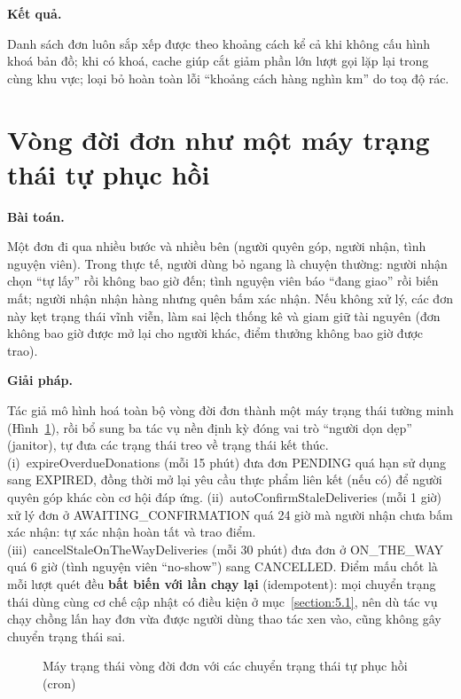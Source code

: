 \documentclass[../main.tex]{subfiles}%
\begin{document}
\textbf{Kết quả.} 

Danh sách đơn luôn sắp xếp được theo khoảng cách kể cả khi không cấu hình khoá bản đồ; khi có khoá, cache giúp cắt giảm phần lớn lượt gọi lặp lại trong cùng khu vực; loại bỏ hoàn toàn lỗi ``khoảng cách hàng nghìn km'' do toạ độ rác.

\section{Vòng đời đơn như một máy trạng thái tự phục hồi}
\label{section:5.3}

\textbf{Bài toán.} 

Một đơn đi qua nhiều bước và nhiều bên (người quyên góp, người nhận, tình nguyện viên). Trong thực tế, người dùng bỏ ngang là chuyện thường: người nhận chọn ``tự lấy'' rồi không bao giờ đến; tình nguyện viên báo ``đang giao'' rồi biến mất; người nhận nhận hàng nhưng quên bấm xác nhận. Nếu không xử lý, các đơn này kẹt trạng thái vĩnh viễn, làm sai lệch thống kê và giam giữ tài nguyên (đơn không bao giờ được mở lại cho người khác, điểm thưởng không bao giờ được trao).

\textbf{Giải pháp.} 

Tác giả mô hình hoá toàn bộ vòng đời đơn thành một máy trạng thái tường minh (Hình~\ref{fig:state_lifecycle}), rồi bổ sung ba tác vụ nền định kỳ đóng vai trò ``người dọn dẹp'' (janitor), tự đưa các trạng thái treo về trạng thái kết thúc. (i)~expireOverdueDonations (mỗi 15 phút) đưa đơn PENDING quá hạn sử dụng sang EXPIRED, đồng thời mở lại yêu cầu thực phẩm liên kết (nếu có) để người quyên góp khác còn cơ hội đáp ứng. (ii)~autoConfirmStaleDeliveries (mỗi 1 giờ) xử lý đơn ở AWAITING\_CONFIRMATION quá 24 giờ mà người nhận chưa bấm xác nhận: tự xác nhận hoàn tất và trao điểm. (iii)~cancelStaleOnTheWayDeliveries (mỗi 30 phút) đưa đơn ở ON\_THE\_WAY quá 6 giờ (tình nguyện viên ``no-show'') sang CANCELLED.
Điểm mấu chốt là mỗi lượt quét đều \textbf{bất biến với lần chạy lại} (idempotent): mọi chuyển trạng thái dùng cùng cơ chế cập nhật có điều kiện ở mục~\ref{section:5.1}, nên dù tác vụ chạy chồng lấn hay đơn vừa được người dùng thao tác xen vào, cũng không gây chuyển trạng thái sai.

\begin{figure}[H]
    \centering
    \caption{Máy trạng thái vòng đời đơn với các chuyển trạng thái tự phục hồi (cron)}
    \label{fig:state_lifecycle}
\end{figure}
\end{document}
